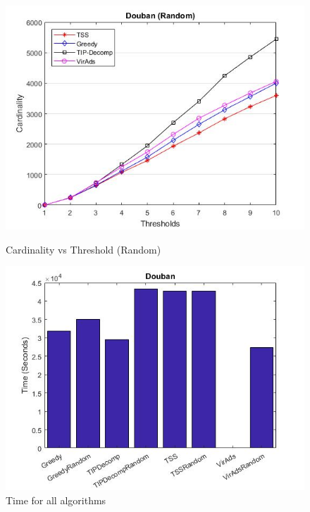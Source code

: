\begin{figure}[h!]
\begin{minipage}[t]{0.50\textwidth}
\includegraphics[width=\linewidth,keepaspectratio=true]{images/doubanresultrandom.jpg}
\caption{Cardinality vs Threshold (Random)}

\end{minipage}
\begin{minipage}[t]{0.50\textwidth}
\includegraphics[width=\linewidth,keepaspectratio=true]{images/doubantime1.jpg}
\caption{Time for all algorithms}
\end{minipage}
\end{figure}

